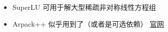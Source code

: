 
\begin{issues}
\issueDraft
\end{issues}

\begin{itemize}
\item SuperLU 可用于解大型稀疏非对称线性方程组
\item Arpack++ 似乎用到了（或者是可选依赖）
\href{https://portal.nersc.gov/project/sparse/superlu/}{官网}
\end{itemize}
